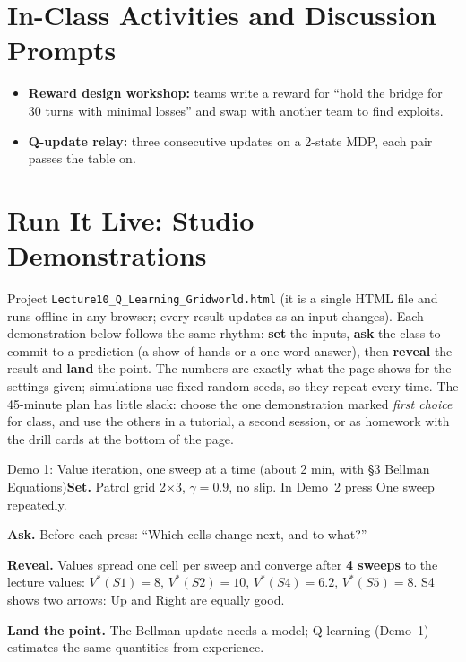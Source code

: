 \documentclass[11pt]{article}
\begin{document}
\section{In-Class Activities and Discussion Prompts}\label{sec:act}\begin{itemize}\item \textbf{Reward design workshop:} teams write a reward for ``hold the bridge for 30 turns with minimal losses'' and swap with another team to find exploits.\item \textbf{Q-update relay:} three consecutive updates on a 2-state MDP, each pair passes the table on.\end{itemize}

\section{Run It Live: Studio Demonstrations}\label{sec:live}

Project \texttt{Lecture10\_Q\_Learning\_Gridworld.html} (it is a single HTML file and runs offline in any browser; every result updates as an input changes). Each demonstration below follows the same rhythm: \textbf{set} the inputs, \textbf{ask} the class to commit to a prediction (a show of hands or a one-word answer), then \textbf{reveal} the result and \textbf{land} the point. The numbers are exactly what the page shows for the settings given; simulations use fixed random seeds, so they repeat every time. The 45-minute plan has little slack: choose the one demonstration marked \emph{first choice} for class, and use the others in a tutorial, a second session, or as homework with the drill cards at the bottom of the page.

\begin{live}{Demo 1: Value iteration, one sweep at a time (about 2 min, with \S3 Bellman Equations)}\textbf{Set.} Patrol grid 2$\times$3, $\gamma=0.9$, no slip. In Demo~2 press \textsf{One sweep} repeatedly.\par\smallskip\textbf{Ask.} Before each press: ``Which cells change next, and to what?''\par\smallskip\textbf{Reveal.} Values spread one cell per sweep and converge after \textbf{4 sweeps} to the lecture values: $V^*(S1)=8$, $V^*(S2)=10$, $V^*(S4)=6.2$, $V^*(S5)=8$. S4 shows two arrows: Up and Right are equally good.\par\smallskip\textbf{Land the point.} The Bellman update needs a model; Q-learning (Demo~1) estimates the same quantities from experience.\end{live}
\end{document}
